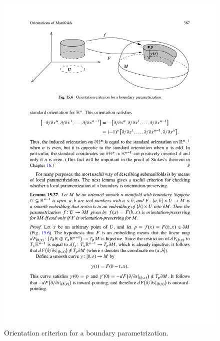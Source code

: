 \begin{figure}[htbp]
\centering
\includegraphics{pictures/boundary-para}
\caption{Orientation criterion for a boundary parametrization.}
\end{figure}
